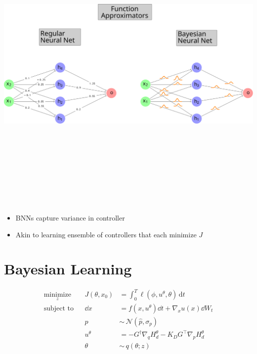 \documentclass[
]{report}
\providecommand{\tightlist}{%
  \setlength{\itemsep}{0pt}\setlength{\parskip}{0pt}}\usepackage{longtable,booktabs,array}
\begin{document}
\includegraphics[width=6.25in,height=5.20833in]{contents/assets/regular_vs_bayesian.svg}

~

\begin{itemize}
\tightlist
\item
  BNNs capture variance in controller
\item
  Akin to learning ensemble of controllers that each minimize \(J\)
\end{itemize}

\hypertarget{bayesian-learning}{%
\section{Bayesian Learning}\label{bayesian-learning}}

\begin{tcolorbox}[enhanced jigsaw, opacityback=0, breakable, leftrule=.75mm, toptitle=1mm, rightrule=.15mm, toprule=.15mm, bottomrule=.15mm, opacitybacktitle=0.6, colbacktitle=quarto-callout-important-color!10!white, colframe=quarto-callout-important-color-frame, title={Bayesian Passivity-based Control}, bottomtitle=1mm, left=2mm, colback=white, arc=.35mm, titlerule=0mm, coltitle=black]
\[
\begin{aligned}
\underset{z}{\text{minimize}} && J(\theta, x_0) &= \int_{0}^{T} \ell \left(\phi,u^\theta,\theta\right)\, \text{d} t \\
\text{subject to} &&
\dd x &= f(x, u^{\theta}) 
        \dd t + \nabla_x u(x) \dd W_t \\
&& p &\sim \, \mathcal{N}(\hat{p}, \sigma_p) \\
&& u^\theta &= -G^{\dagger} \nabla_q H_d^{\theta}  - K_D G^\top \nabla_p H_d^{\theta} \\
&& \theta &\sim \, q(\theta; z)
\end{aligned}
\]
\end{tcolorbox}
\end{document}
